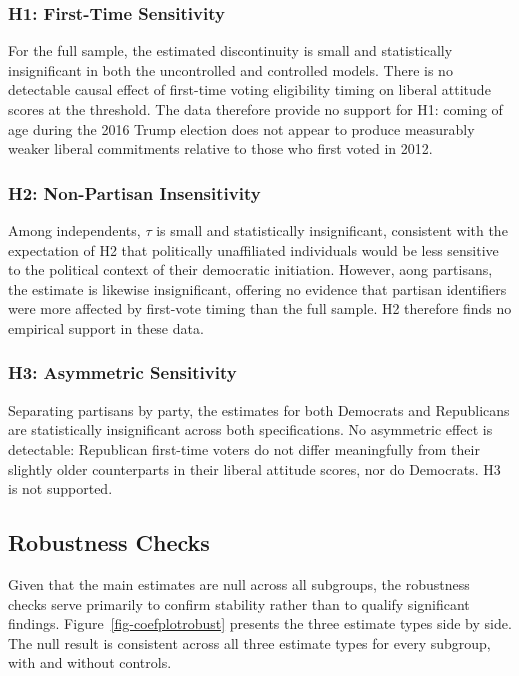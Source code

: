 \documentclass[
  10pt,
  letterpaper,
  DIV=11,
  numbers=noendperiod]{scrartcl}
\begin{document}
\subsubsection{H1: First-Time
Sensitivity}\label{h1-first-time-sensitivity}

For the full sample, the estimated discontinuity is small and
statistically insignificant in both the uncontrolled and controlled
models. There is no detectable causal effect of first-time voting
eligibility timing on liberal attitude scores at the threshold. The data
therefore provide no support for H1: coming of age during the 2016 Trump
election does not appear to produce measurably weaker liberal
commitments relative to those who first voted in 2012.

\subsubsection{H2: Non-Partisan
Insensitivity}\label{h2-non-partisan-insensitivity}

Among independents, \(\tau\) is small and statistically insignificant,
consistent with the expectation of H2 that politically unaffiliated
individuals would be less sensitive to the political context of their
democratic initiation. However, aong partisans, the estimate is likewise
insignificant, offering no evidence that partisan identifiers were more
affected by first-vote timing than the full sample. H2 therefore finds
no empirical support in these data.

\subsubsection{H3: Asymmetric
Sensitivity}\label{h3-asymmetric-sensitivity}

Separating partisans by party, the estimates for both Democrats and
Republicans are statistically insignificant across both specifications.
No asymmetric effect is detectable: Republican first-time voters do not
differ meaningfully from their slightly older counterparts in their
liberal attitude scores, nor do Democrats. H3 is not supported.

\subsection{Robustness Checks}\label{robustness-checks}

Given that the main estimates are null across all subgroups, the
robustness checks serve primarily to confirm stability rather than to
qualify significant findings. Figure~\ref{fig-coefplotrobust} presents
the three estimate types side by side. The null result is consistent
across all three estimate types for every subgroup, with and without
controls.
\end{document}
